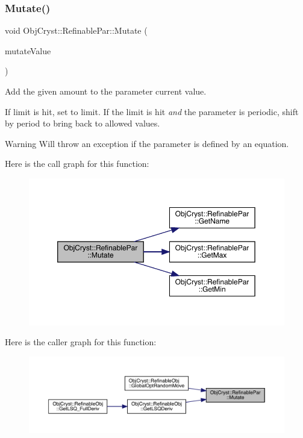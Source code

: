 \subsubsection{\texorpdfstring{Mutate()}{Mutate()}}
{\footnotesize\ttfamily void Obj\+Cryst\+::\+Refinable\+Par\+::\+Mutate (\begin{DoxyParamCaption}\item[{const R\+E\+AL}]{mutate\+Value }\end{DoxyParamCaption})}



Add the given amount to the parameter current value. 

If limit is hit, set to limit. If the limit is hit {\itshape and} the parameter is periodic, shift by period to bring back to allowed values. \begin{DoxyWarning}{Warning}
Will throw an exception if the parameter is defined by an equation. 
\end{DoxyWarning}
Here is the call graph for this function\+:
\nopagebreak
\begin{figure}[H]
\begin{center}
\leavevmode
\includegraphics[width=350pt]{class_obj_cryst_1_1_refinable_par_abd6a06bbb5eb59d80515ebdad2612da8_cgraph}
\end{center}
\end{figure}
Here is the caller graph for this function\+:
\nopagebreak
\begin{figure}[H]
\begin{center}
\leavevmode
\includegraphics[width=350pt]{class_obj_cryst_1_1_refinable_par_abd6a06bbb5eb59d80515ebdad2612da8_icgraph}
\end{center}
\end{figure}
\mbox{\label{class_obj_cryst_1_1_refinable_par_a696f87a0a129cfd270144532d664d093}} 
